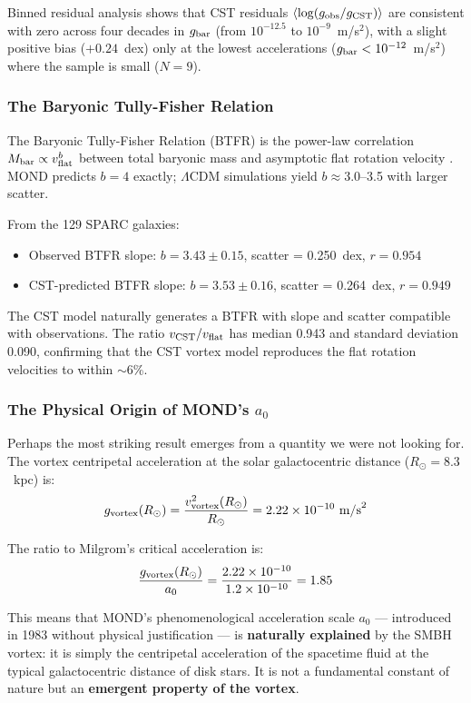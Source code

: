 \documentclass[11pt,a4paper]{article}
\providecommand{\tightlist}{\setlength{\itemsep}{0pt}\setlength{\parskip}{0pt}}
\begin{document}
Binned residual analysis shows that CST residuals $\langle \log(g_{\rm obs}/g_{\rm CST}) \rangle$ are consistent with zero across four decades in $g_{\rm bar}$ (from $10^{-12.5}$ to $10^{-9}$~m/s$^2$), with a slight positive bias ($+0.24$~dex) only at the lowest accelerations ($g_{\rm bar} < 10^{-12}$~m/s$^2$) where the sample is small ($N = 9$).

\subsubsection{The Baryonic Tully-Fisher Relation}

The Baryonic Tully-Fisher Relation (BTFR) is the power-law correlation $M_{\rm bar} \propto v_{\rm flat}^b$ between total baryonic mass and asymptotic flat rotation velocity \cite{McGaugh2016,Lelli2016}. MOND predicts $b = 4$ exactly; $\Lambda$CDM simulations yield $b \approx 3.0$--3.5 with larger scatter.

From the 129 SPARC galaxies:
\begin{itemize}
\tightlist
\item Observed BTFR slope: $b = 3.43 \pm 0.15$, scatter = 0.250~dex, $r = 0.954$
\item CST-predicted BTFR slope: $b = 3.53 \pm 0.16$, scatter = 0.264~dex, $r = 0.949$
\end{itemize}

The CST model naturally generates a BTFR with slope and scatter compatible with observations. The ratio $v_{\rm CST}/v_{\rm flat}$ has median 0.943 and standard deviation 0.090, confirming that the CST vortex model reproduces the flat rotation velocities to within $\sim$6\%.

\subsubsection{The Physical Origin of MOND's $a_0$}

Perhaps the most striking result emerges from a quantity we were not looking for. The vortex centripetal acceleration at the solar galactocentric distance ($R_\odot = 8.3$~kpc) is:
\[g_{\rm vortex}(R_\odot) = \frac{v_{\rm vortex}^2(R_\odot)}{R_\odot} = 2.22 \times 10^{-10}~{\rm m/s}^2\]

The ratio to Milgrom's critical acceleration is:
\[\frac{g_{\rm vortex}(R_\odot)}{a_0} = \frac{2.22 \times 10^{-10}}{1.2 \times 10^{-10}} = 1.85\]

This means that MOND's phenomenological acceleration scale $a_0$ --- introduced in 1983 without physical justification --- is \textbf{naturally explained} by the SMBH vortex: it is simply the centripetal acceleration of the spacetime fluid at the typical galactocentric distance of disk stars. It is not a fundamental constant of nature but an \textbf{emergent property of the vortex}.
\end{document}
